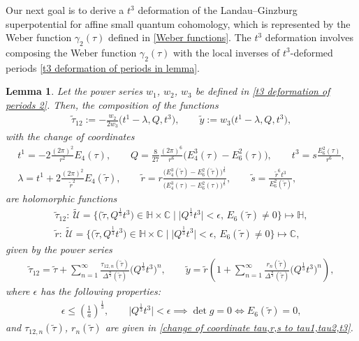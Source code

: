 \documentclass[11pt]{article}
\numberwithin{equation}{section}
\numberwithin{equation}{section}
\newtheorem{Lemma}[Theorem]{Lemma}
\begin{document}
Our next goal is to derive a $t^3$ deformation of the Landau--Ginzburg superpotential for affine small quantum cohomology, which is represented by the Weber function $\gamma_2(\tau)$ defined in \eqref{Weber functions}. The $t^3$ deformation involves composing the Weber function $\gamma_2(\tau)$ with the local inverses of $t^3$-deformed periods \eqref{t3 deformation of periods in lemma}.

\begin{Lemma}\label{lemma Milanov deformation 1 on LG superpotential}
Let the power series $w_1$, $w_2$, $w_3$ be defined in \eqref{t3 deformation of periods 2}.
Then, the composition of the functions
\begin{gather}
\tilde \tau_{12}:=-\frac{w_2}{2w_3}\bigl(t^1-\lambda,Q,t^3\bigr),\qquad
\tilde y:=w_3\bigl(t^1-\lambda,Q,t^3\bigr),\label{affine extended w2 w3 Big lemma}
\end{gather}
with the change of coordinates
\begin{gather}
t^1= -2\frac{(2\pi)^2}{r^2}E_4(\tau),\qquad Q= \frac{8}{27}\frac{(2\pi)^6}{r^6}\bigl(E_4^3(\tau)-E_6^2(\tau)\bigr),\qquad t^3= s\frac{E_6^2(\tau)}{r^6},\nonumber\\
\lambda= t^1+2\frac{(2\pi)^2}{\tilde r^2}E_4(\tilde\tau), \qquad \tilde r=r\frac{\bigl(E_4^3(\tilde\tau)-E_6^2(\tilde\tau)\bigr)^{\frac{1}{6}}}{\bigl(E_4^3(\tau)-E_6^2(\tau)\bigr)^{\frac{1}{6}}},\qquad \tilde s=\frac{\tilde r^6t^3}{E_6^2(\tilde\tau)},\label{change of extended coordinates flat intersection and auxiliary}
\end{gather}
are holomorphic functions
\begin{gather*}
\tilde\tau_{12}\colon \ \tilde{\mathcal{U}}=\bigl\{ \bigl(\tilde\tau,Q^{\frac{1}{3}}t^3\bigr)\in\mathbb{H}\times \mathbb{C}\mid \big|Q^{\frac{1}{3}}t^3\big|<\epsilon,\, E_6(\tilde\tau)\neq 0 \bigr\}\mapsto \mathbb{H},\\
\tilde r\colon \ \tilde{\mathcal{U}}=\bigl\{ \bigl(\tilde\tau,Q^{\frac{1}{3}}t^3\bigr)\in\mathbb{H}\times \mathbb{C}\mid \big|Q^{\frac{1}{3}}t^3\big|<\epsilon, \, E_6(\tilde\tau)\neq 0 \bigr\}\mapsto \mathbb{C},
\end{gather*}
given by the power series
\begin{gather}
\tilde\tau_{12}=\tilde\tau+\sum_{n=1}^{\infty}\frac{\tau_{12,n}(\tilde\tau)}{\Delta^{\frac{n}{3}}(\tilde\tau)} \bigl( Q^{\frac{1}{3}}t^3\bigr)^n,\qquad
\tilde y=\tilde r\left( 1+\sum_{n=1}^{\infty} \frac{r_n(\tilde\tau)}{\Delta^{\frac{n}{3}}(\tilde\tau)} \bigl(Q^{\frac{1}{3}} t^3 \bigr)^n \right),\label{affine in lambda t3 deformation of periods new coordinates z2 over z3 lemma}
\end{gather}
where $\epsilon$ has the following properties:
\begin{gather*}
\epsilon\leq \left(\frac{1}{a}\right)^{\frac{1}{3}} ,\qquad
\big|Q^{\frac{1}{3}}t^3\big|<\epsilon \implies \det g=0 \iff E_6(\tilde\tau)=0,
\end{gather*}
 and $\tau_{12,n}(\tilde\tau)$, $r_n(\tilde\tau)$ are given in \eqref{change of coordinate tau,r,s to tau1,tau2,t3}.


\end{Lemma}
\end{document}
